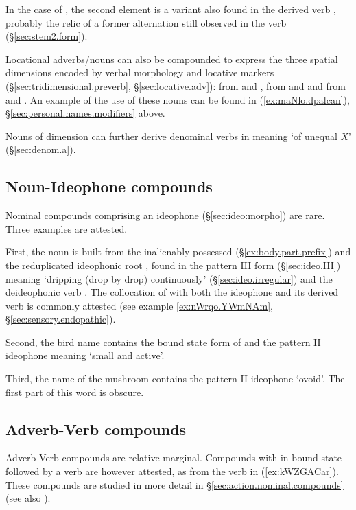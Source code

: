 In the case of , the second element  is a variant also found in the derived verb , probably the relic of a former  alternation still observed in the verb  (§\ref{sec:stem2.form}).

Locational adverbs/nouns can also be compounded to express the three spatial dimensions encoded by verbal morphology and locative markers (§\ref{sec:tridimensional.preverb}, §\ref{sec:locative.adv}):  from  and ,  from  and  and  from  and . An example of the use of these nouns can be found in (\ref{ex:maNlo.dpalcan}), §\ref{sec:personal.names.modifiers} above.

Nouns of dimension can further derive denominal verbs in  meaning `of unequal $X$' (§\ref{sec:denom.a}).

\subsection{Noun-Ideophone compounds} \label{sec.n.idph.compounds}
Nominal compounds comprising an ideophone (§\ref{sec:ideo:morpho}) are rare. Three examples are attested.
 
First, the noun  is built from the inalienably possessed  (§\ref{ex:body.part.prefix}) and the reduplicated ideophonic root , found in the pattern III form (§\ref{sec:ideo.III})  meaning `dripping (drop by drop) continuously' (§\ref{sec:ideo.irregular}) and the deideophonic verb . The collocation of  with both the ideophone and its derived verb is commonly attested (see example \ref{ex:nWrqo.YWmNAm}, §\ref{sec:sensory.endopathic}).
 
Second, the bird name  contains the bound state form of  and the pattern II ideophone  meaning `small and active'.


Third, the name of the mushroom  contains the pattern II ideophone  `ovoid'. The first part of this word is obscure.

\subsection{Adverb-Verb compounds} \label{sec.adv.v.compounds}
Adverb-Verb compounds are relative marginal. Compounds with  in bound state  followed by a verb are however attested, as  from the verb  in (\ref{ex:kWZGACar}). These compounds are studied in more detail in §\ref{sec:action.nominal.compounds} (see also \citealt[252]{jacques16complementation}).

